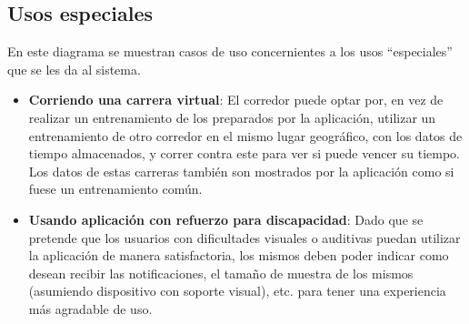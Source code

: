 \subsection{Usos especiales}
En este diagrama se muestran casos de uso concernientes a los usos ``especiales'' que se les da al sistema.


\begin{itemize}
	\item \textbf{Corriendo una carrera virtual}: El corredor puede optar por, en vez de realizar un entrenamiento de los preparados por la aplicación, utilizar un entrenamiento de otro corredor en el mismo lugar geográfico, con los datos de tiempo almacenados, y correr contra este para ver si puede vencer su tiempo. Los datos de estas carreras también son mostrados por la aplicación como si fuese un entrenamiento común.
	\item \textbf{Usando aplicación con refuerzo para discapacidad}: Dado que se pretende que los usuarios con dificultades visuales o auditivas puedan utilizar la aplicación de manera satisfactoria, los mismos deben poder indicar como desean recibir las notificaciones, el tamaño de muestra de los mismos (asumiendo dispositivo con soporte visual), etc. para tener una experiencia más agradable de uso.
\end{itemize}
